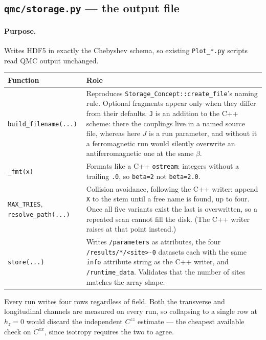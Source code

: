 \documentclass[11pt,a4paper]{article}
\newcommand{\code}[1]{\texttt{#1}}
\newcommand{\file}[1]{\texttt{\textbf{#1}}}
\begin{document}
\subsection{\file{qmc/storage.py} --- the output file}

\paragraph{Purpose.} Writes HDF5 in exactly the Chebyshev schema, so existing
\code{Plot\_*.py} scripts read QMC output unchanged.

\begin{longtable}{@{}p{}p{}@{}}
\toprule
Function & Role \\
\midrule
\endhead
\code{build\_filename(...)} &
  Reproduces \code{Storage\_Concept::create\_file}'s naming rule. Optional
  fragments appear only when they differ from their defaults. \code{J} is an
  addition to the C++ scheme: there the couplings live in a named source file,
  whereas here $J$ is a run parameter, and without it a ferromagnetic run would
  silently overwrite an antiferromagnetic one at the same $\beta$. \\
\code{\_fmt(x)} &
  Formats like a C++ \code{ostream}: integers without a trailing \code{.0}, so
  \code{beta=2} not \code{beta=2.0}. \\
\code{MAX\_TRIES}, \code{resolve\_path(...)} &
  Collision avoidance, following the C++ writer: append \code{X} to the stem
  until a free name is found, up to four. Once all five variants exist the last
  is overwritten, so a repeated scan cannot fill the disk. (The C++ writer
  raises at that point instead.) \\
\code{store(...)} &
  Writes \code{/parameters} as attributes, the four
  \code{/results/*/<site>-0} datasets each with the same \code{info} attribute
  string as the C++ writer, and \code{/runtime\_data}. Validates that the number
  of sites matches the array shape. \\
\bottomrule
\end{longtable}

Every run writes four rows regardless of field. Both the transverse and
longitudinal channels are measured on every run, so collapsing to a single row
at $h_z=0$ would discard the independent $C^{zz}$ estimate --- the cheapest
available check on $C^{xx}$, since isotropy requires the two to agree.

\end{document}
